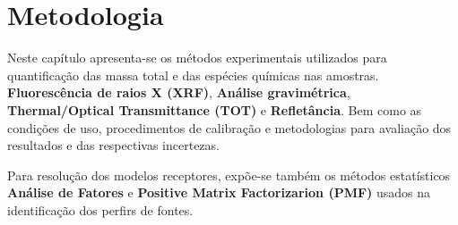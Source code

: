 \chapter{Metodologia}

Neste capítulo apresenta-se os métodos experimentais utilizados para 
quantificação das massa total e das espécies químicas nas amostras. 
\textbf{Fluorescência de raios X (XRF)}, \textbf{Análise gravimétrica},
\textbf{Thermal/Optical Transmittance (TOT)} e \textbf{Refletância}.
Bem como as condições de uso, procedimentos de calibração e 
metodologias para avaliação dos resultados e das respectivas incertezas.

Para resolução dos modelos receptores, expõe-se também os métodos 
estatísticos \textbf{Análise de Fatores} e 
\textbf{Positive Matrix Factorizarion (PMF)} usados na identificação 
dos perfirs de fontes. 






